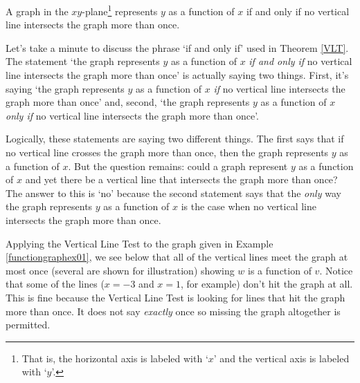 \medskip

\colorbox{ResultColor}{\bbm

\begin{thm}  A graph in the $xy$-plane\footnote{That is, the horizontal axis is labeled with `$x$' and the vertical axis is labeled with `$y$'.}  represents $y$ as a function of $x$ if and only if no vertical line intersects the graph more than once.
\label{VLT}

\end{thm}

\ebm}

\bigskip

Let's take a minute to discuss the phrase `if and only if' used in Theorem \ref{VLT}.   The statement `the graph represents $y$ as a function of $x$ \textit{if and only if} no vertical line intersects the graph more than once' is actually saying two things.  First, it's saying `the graph represents $y$ as a function of $x$  \textit{if} no vertical line intersects the graph more than once' and, second,  `the graph represents $y$ as a function of $x$  \textit{only if} no vertical line intersects the graph more than once'.   

\medskip

Logically, these statements are saying two different things. The first says that if no vertical line crosses the graph more than once, then the graph represents $y$ as a function of $x$.  But the question remains:  could a graph represent $y$ as a function of $x$ and yet there be a vertical line that intersects the graph more than once?  The answer to this is `no' because the second statement says that the \textit{only} way the graph represents $y$ as a function of $x$ is the case when no vertical line intersects the graph more than once.

\medskip

Applying the Vertical Line Test to the graph given in Example \ref{functiongraphex01}, we see below that all of the vertical lines meet the graph at most once (several are shown for illustration) showing $w$ is a function of $v$.  Notice that some of the lines ($x = -3$ and $x = 1$, for example) don't hit the graph at all.  This is fine because the Vertical Line Test is looking for lines that hit the graph more than once.  It does not say \emph{exactly} once so missing the graph altogether is permitted.


